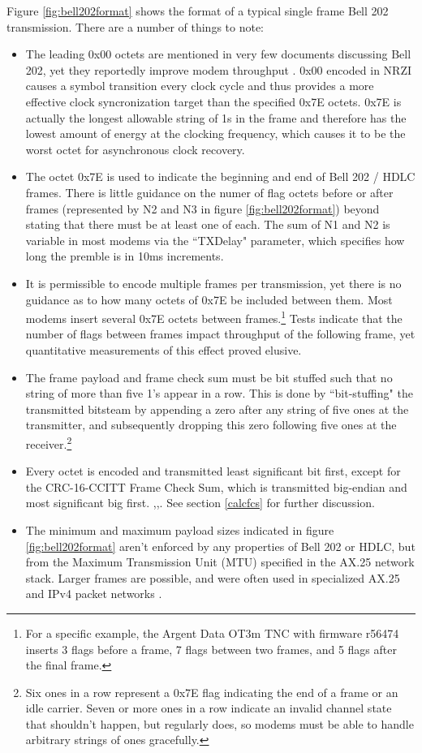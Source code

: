 \documentclass[12pt,letterpaper]{article}
\begin{document}
Figure \ref{fig:bell202format} shows the format of a typical single frame
Bell 202 transmission. There are a number of things to
note:
\begin{itemize}
	\item The leading 0x00 octets are mentioned in very few documents
		discussing Bell 202, yet they reportedly improve modem
		throughput \cite{millerinterview}\cite{aprsunveiled}. 
		0x00 encoded in NRZI causes a symbol transition
		every clock cycle and thus provides a more effective clock 
		syncronization target than the specified 0x7E octets. 0x7E is actually 
		the longest allowable string of 1s in the frame and 
		therefore has the lowest amount of energy at the clocking frequency,
		which causes it to be the worst 
		octet for asynchronous clock recovery.
	\item The octet 0x7E is used to indicate the beginning and end of 
		Bell 202 / HDLC frames.
		There is little guidance on the numer of flag octets before
		or after frames (represented by N2 and N3 in 
		figure \ref{fig:bell202format})
		beyond stating that there must be at least one of each. The sum of
		N1 and N2 is variable in most modems via the ``TXDelay" parameter,
		which specifies how long the premble is in 10ms increments.
	\item It is permissible to encode multiple 
		frames per transmission, yet there is no guidance as to how
		many octets of 0x7E be included between them.
		Most modems insert several 0x7E octets between 
		frames.\footnote{For a specific example, the Argent Data OT3m TNC 
			with firmware r56474 inserts 3 flags before
		a frame, 7 flags between two frames, and 5 flags after the final frame.}
		Tests indicate that the number of flags between frames 
		impact throughput of the following frame, yet
		quantitative measurements of this effect proved elusive.
	\item The frame payload and frame check sum must be bit stuffed such 
		that no string of more than five 1's appear in a row.
		This is done by ``bit-stuffing" the transmitted bitsteam by
		appending a zero after any string of five ones at the transmitter,
		and subsequently dropping this zero following five ones at the 
		receiver.\footnote{Six ones in a row represent a 0x7E flag indicating 
			the end of a frame or an idle carrier.
			Seven or more ones in a row indicate an invalid channel state
			that shouldn't happen, but regularly does, so modems must be 
			able to handle arbitrary strings of ones gracefully.}
	\item Every octet is encoded and transmitted least significant bit first,
		except for the CRC-16-CCITT Frame Check Sum, 
		which is transmitted big-endian
		and most significant big first.
		\cite{n1vgphy},\cite[\S8.1.1-2]{ituv42},\cite[\S3.8]{ax25spec}.
		See section \ref{calcfcs} for further discussion.
	\item The minimum and maximum payload sizes indicated in figure 
		\ref{fig:bell202format} aren't enforced by any properties of 
		Bell 202 or HDLC, but from the Maximum Transmission Unit (MTU)
		specified in the AX.25 network stack.
		Larger frames are possible, and were often used in specialized 
		AX.25 and IPv4 packet networks \cite{pattersoninterview}.


\end{itemize}
\end{document}
